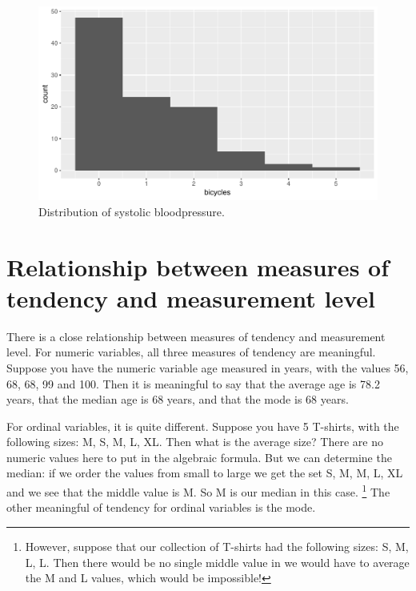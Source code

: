 \documentclass[]{report}\usepackage[]{graphicx}\usepackage[]{color}
\makeatletter
\def\maxwidth{ %
  \ifdim\Gin@nat@width>\linewidth
    \linewidth
  \else
    \Gin@nat@width
  \fi
}
\makeatother
\begin{document}
\begin{enumerate}
\begin{figure}
{\centering \includegraphics[width=\maxwidth]{figure/mode2-1} 

}

\caption[Distribution of systolic bloodpressure]{Distribution of systolic bloodpressure.}\label{fig:mode2}
\end{figure}





\end{enumerate}


\section{Relationship between measures of tendency and measurement level}

There is a close relationship between measures of tendency and measurement level. For numeric variables, all three measures of tendency are meaningful. Suppose you have the numeric variable age measured in years, with the values 56, 68, 68, 99 and 100. Then it is meaningful to say that the average age is 78.2 years, that the median age is 68 years, and that the mode is 68 years.

For ordinal variables, it is quite different. Suppose you have 5 T-shirts, with the following sizes: M, S, M, L, XL. Then what is the average size? There are no numeric values here to put in the algebraic formula. But we can determine the median: if we order the values from small to large we get the set S, M, M, L, XL and we see that the middle value is M. So M is our median in this case. \footnote{However, suppose that our collection of T-shirts had the following sizes: S, M, L, L. Then there would be no single middle value in we would have to average the M and L values, which would be impossible!} The other meaningful of tendency for ordinal variables is the mode.
\end{document}
